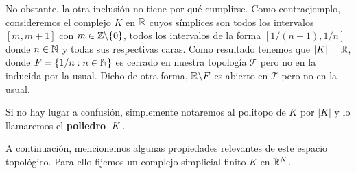 No obstante, la otra inclusión no tiene por qué cumplirse. Como contraejemplo, consideremos
el complejo \(K\) en \(\mathbb{R}\) cuyos símplices son todos los intervalos \([m,m+1]\) con \(m
\in \mathbb{Z} \backslash \{0\}\), todos los intervalos de la forma \([1/( n+1), 1/n]\)
donde \(n \in \mathbb{N}\) y todas sus respectivas caras. Como resultado tenemos que \(|K| =
\mathbb{R}\), donde \(F = \{1/n : n \in \mathbb{N}\}\) es cerrado en nuestra topología
\(\mathcal{T}\) pero no en la inducida por la usual. Dicho de otra forma,
\(\mathbb{R} \backslash F\) es abierto en \(\mathcal{T}\) pero no en la usual.

Si no hay lugar a confusión, simplemente notaremos al politopo de \(K\) por \(|K|\) y
lo llamaremos el \textbf{poliedro} \(|K|\).

A continuación, mencionemos algunas propiedades relevantes de este espacio topológico.
Para ello fijemos un complejo simplicial finito \(K\) en \(\mathbb{R}^{N}\).

